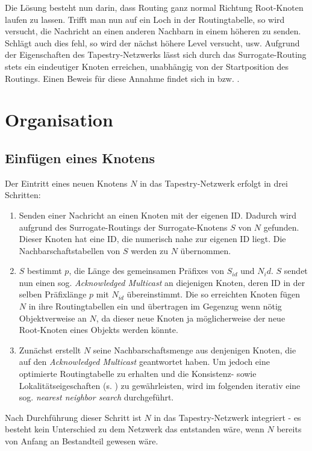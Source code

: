Die Lösung besteht nun darin, dass Routing ganz normal Richtung Root-Knoten 
laufen zu lassen. Trifft man nun auf ein Loch in der Routingtabelle, so wird 
versucht, die Nachricht an einen anderen Nachbarn in einem höheren zu senden. 
Schlägt auch dies fehl, so wird der nächst höhere Level versucht, usw. Aufgrund 
der Eigenschaften des Tapestry-Netzwerks lässt sich durch das Surrogate-Routing 
stets ein eindeutiger Knoten erreichen, unabhängig von der Startposition des 
Routings. Einen Beweis für diese Annahme findet sich in \cite{HildrumKRZ02} bzw. 
\cite{Schindelhauer2004}.

\section{Organisation}
\subsection{Einfügen eines Knotens}
Der Eintritt eines neuen Knotens $N$ in das Tapestry-Netzwerk erfolgt in drei
Schritten:

\begin{enumerate}
  \item Senden einer Nachricht an einen Knoten mit der eigenen ID. Dadurch wird
  aufgrund des Surrogate-Routings der Surrogate-Knotens $S$ von $N$ gefunden.
  Dieser Knoten hat eine ID, die numerisch nahe zur eigenen ID liegt. Die
  Nachbarschaftstabellen von $S$ werden zu $N$ übernommen.
  \item $S$ bestimmt $p$, die Länge des gemeinsamen Präfixes von $S_{id}$ und
  $N{_id}$. $S$ sendet nun einen sog. \textsl{Acknowledged Multicast} an
  diejenigen Knoten, deren ID in der selben Präfixlänge $p$ mit $N_{id}$
  übereinstimmt. Die so erreichten Knoten fügen $N$ in ihre Routingtabellen ein
  und übertragen im Gegenzug wenn nötig Objektverweise an $N$, da dieser neue
  Knoten ja möglicherweise der neue Root-Knoten eines Objekts werden könnte.
  \item Zunächst erstellt $N$ seine Nachbarschaftsmenge aus denjenigen Knoten,
  die auf den \textsl{Acknowledged Multicast} geantwortet haben. Um jedoch
  eine optimierte Routingtabelle zu erhalten und die Konsistenz- sowie
  Lokalitätseigeschaften (s. \cite{HildrumKRZ02}) zu gewährleisten, wird im
  folgenden iterativ eine sog. \textsl{nearest neighbor search} durchgeführt.
\end{enumerate}

Nach Durchführung dieser Schritt ist $N$ in das Tapestry-Netzwerk integriert -
es besteht kein Unterschied zu dem Netzwerk das entstanden wäre, wenn $N$
bereits von Anfang an Bestandteil gewesen wäre.

